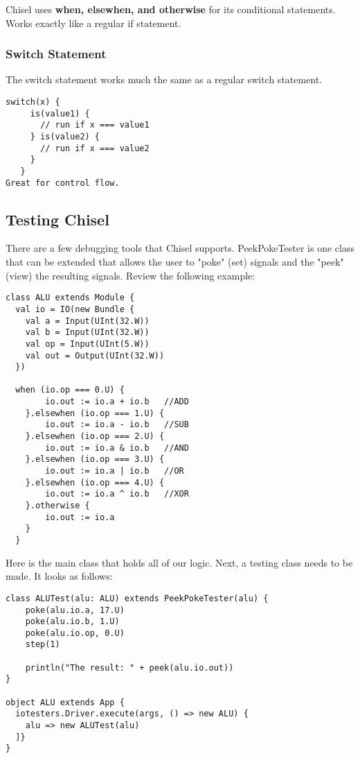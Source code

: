 \documentclass[12pt, letterpaper]{report}
\begin{document}
Chisel uses \textbf{when, elsewhen, and otherwise} for its conditional statements. Works exactly like a regular if statement.
\subsubsection{Switch Statement}
The switch statement works much the same as a regular switch statement.
\begin{lstlisting}[style=scala]
   switch(x) {
     is(value1) {
       // run if x === value1
     } is(value2) {
       // run if x === value2
     }
   }
Great for control flow.
\end{lstlisting}

\subsection{Testing Chisel}
There are a few debugging tools that Chisel supports. PeekPokeTester is one class that can be extended that allows the user 
to "poke" (set) signals and the "peek" (view) the resulting signals.
Review the following example:

\begin{lstlisting}[style=scala]
class ALU extends Module {
  val io = IO(new Bundle {
    val a = Input(UInt(32.W))
    val b = Input(UInt(32.W))
    val op = Input(UInt(5.W))
    val out = Output(UInt(32.W))
  })

  when (io.op === 0.U) {
        io.out := io.a + io.b   //ADD
    }.elsewhen (io.op === 1.U) {
        io.out := io.a - io.b   //SUB
    }.elsewhen (io.op === 2.U) {
        io.out := io.a & io.b   //AND
    }.elsewhen (io.op === 3.U) {
        io.out := io.a | io.b   //OR
    }.elsewhen (io.op === 4.U) {
        io.out := io.a ^ io.b   //XOR
    }.otherwise {
        io.out := io.a
    }
  }
\end{lstlisting}

Here is the main class that holds all of our logic. Next, a testing class needs to be made. It looks as follows:

\begin{lstlisting}[style=scala]
 class ALUTest(alu: ALU) extends PeekPokeTester(alu) {
    poke(alu.io.a, 17.U)
    poke(alu.io.b, 1.U)
    poke(alu.io.op, 0.U)
    step(1)

    println("The result: " + peek(alu.io.out))
}

object ALU extends App {
  iotesters.Driver.execute(args, () => new ALU) {
    alu => new ALUTest(alu)
  ]}
}
\end{lstlisting}
\end{document}
